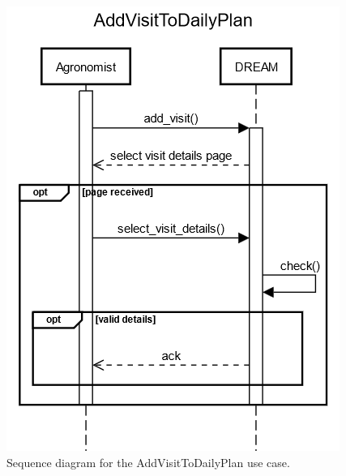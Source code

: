 \documentclass{article}
\begin{document}
\begin{figure}[H]
    \centering
    \includegraphics[scale=0.75]{sequence_diagrams/AddVisitToDailyPlan.png}
    \caption{Sequence diagram for the AddVisitToDailyPlan use case.}
\end{figure}
\newpage
\end{document}
